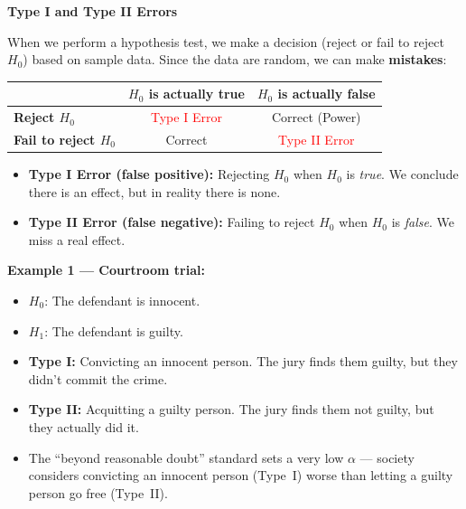 \documentclass[11pt,a4paper]{article}
\begin{document}
\begin{bookexample}
\textbf{\color{blockcolor}Type I and Type II Errors}

\smallskip
When we perform a hypothesis test, we make a decision (reject or fail to reject $H_0$) based on sample data. Since the data are random, we can make \textbf{mistakes}:

\medskip
\begin{center}
\renewcommand{\arraystretch}{1.4}
\begin{tabular}{l|cc}
 & \textbf{$H_0$ is actually true} & \textbf{$H_0$ is actually false} \\
\hline
\textbf{Reject $H_0$}      & \textcolor{red}{Type I Error}  & Correct (Power) \\
\textbf{Fail to reject $H_0$} & Correct              & \textcolor{red}{Type II Error} \\
\end{tabular}
\renewcommand{\arraystretch}{1.0}
\end{center}

\smallskip
\begin{itemize}[leftmargin=1.5em, itemsep=4pt]
  \item \textbf{Type I Error (false positive):} Rejecting $H_0$ when $H_0$ is \emph{true}. We conclude there is an effect, but in reality there is none.

  \item \textbf{Type II Error (false negative):} Failing to reject $H_0$ when $H_0$ is \emph{false}. We miss a real effect.
\end{itemize}

\medskip
\textbf{Example 1 --- Courtroom trial:}
\begin{itemize}[leftmargin=1.5em, itemsep=2pt]
  \item $H_0$: The defendant is innocent.
  \item $H_1$: The defendant is guilty.
  \item \textbf{Type I:} Convicting an innocent person. The jury finds them guilty, but they didn't commit the crime.
  \item \textbf{Type II:} Acquitting a guilty person. The jury finds them not guilty, but they actually did it.
  \item The ``beyond reasonable doubt'' standard sets a very low $\alpha$ --- society considers convicting an innocent person (Type~I) worse than letting a guilty person go free (Type~II).
\end{itemize}


\end{bookexample}
\end{document}
